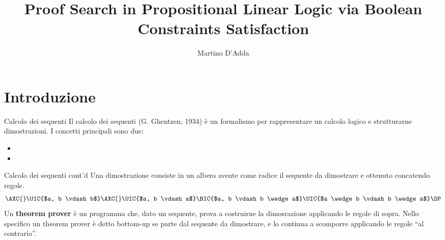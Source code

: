 \documentclass{beamer}
\title{Proof Search in Propositional Linear Logic via Boolean Constraints Satisfaction}
\author{Martino D'Adda}
\begin{document}
\maketitle


\section{Introduzione}
\begin{frame}{Calcolo dei sequenti}
	Il calcolo dei sequenti (G. Ghentzen, 1934) è un formalismo per rappresentare un calcolo logico e strutturarne dimostrazioni.
	I concetti principali sono due:
	\begin{itemize}
		\item {}
		\item {}
	\end{itemize}
\end{frame}

\begin{frame}{Calcolo dei sequenti cont'd}
	Una dimostrazione consiste in un albero avente come radice il sequente da dimostrare e ottenuto concatendo regole.
	$$
	\AXC{}
	\LeftLabel{$A$}
	\UIC{$a, b \vdash b$}
	\AXC{}
	\LeftLabel{$A$}
	\UIC{$a, b \vdash a$}
	\LeftLabel{$\wedge_R$}
	\BIC{$a, b \vdash b \wedge a$}
	\LeftLabel{$\wedge_L$}
	\UIC{$a \wedge b \vdash b \wedge a$}
	\DP
	$$
	Un \textbf{theorem prover} è un programma che, dato un sequente, prova a costruirne la dimosrazione applicando le regole di sopra.
	Nello specifico un theorem prover è detto bottom-up se parte dal sequente da dimostrare, e lo continua a scomporre applicando le regole ``al contrario''.
\end{frame}
\end{document}
